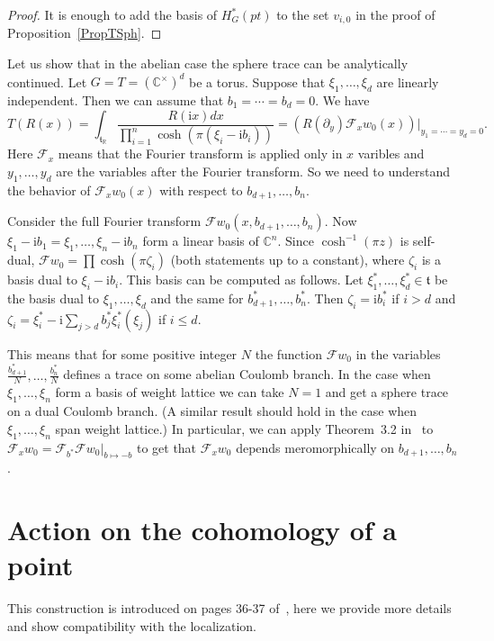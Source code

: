 \documentclass{article}
\newcommand{\R}{\mathbb{R}}
\renewcommand{\C}{\mathbb{C}}
\newcommand{\mf}{\mathfrak}
\newcommand{\mc}[1]{\mathcal{#1}}
\newcommand{\rmi}{\mathrm{i}}
\begin{document}
\begin{proof}
It is enough to add the basis of $H^*_G(pt)$ to the set $v_{i,0}$ in the proof of Proposition~\ref{PropTSph}.
\end{proof}
\begin{rem}
Let us show that in the abelian case the sphere trace can be analytically continued. Let $G=T=(\C^{\times})^d$ be a torus. Suppose that $\xi_1,\ldots,\xi_d$ are linearly independent. Then we can assume that $b_1=\cdots=b_d=0$. We have
\[T(R(x))=\int_{\mf{t}_{\R}}\frac{R(\rmi x)dx}{\prod_{i=1}^n \cosh(\pi(\xi_i-\rmi b_i))}=(R(\partial_y)\mc{F}_xw_0(x))|_{y_1=\cdots=y_d=0}.\] Here $\mc{F}_x$ means that the Fourier transform is applied only in $x$ varibles and $y_1,\ldots,y_d$ are the variables after the Fourier transform. So we need to understand the behavior of $\mc{F}_xw_0(x)$ with respect to $b_{d+1},\ldots,b_n$. 

Consider the full Fourier transform $\mc{F}w_0(x,b_{d+1},\ldots,b_n)$. Now $\xi_1-\rmi b_1=\xi_1,\ldots,\xi_n-\rmi b_n$ form a linear basis of $\C^n$. Since $\cosh^{-1}(\pi z)$ is self-dual, $\mc{F}w_0=\prod \cosh(\pi\zeta_i)$ (both statements up to a constant), where $\zeta_i$ is a basis dual to $\xi_i-\rmi b_i$. This basis can be computed as follows. Let $\xi_1^*,\ldots,\xi_d^*\in\mf{t}$ be the basis dual to $\xi_1,\ldots,\xi_d$ and the same for $b_{d+1}^*,\ldots,b_n^*$. Then $\zeta_i=\rmi b_i^*$ if $i>d$ and $\zeta_i=\xi_i^*-\rmi\sum_{j>d}b_j^*\xi_i^*(\xi_j)$ if $i\leq d$.

This means that for some positive integer $N$ the function $\mc{F}w_0$ in the variables $\frac{b_{d+1}^*}{N},\ldots,\frac{b_n^*}N$ defines a trace on some abelian Coulomb branch. In the case when $\xi_1,\ldots,\xi_n$ form a basis of weight lattice we can take $N=1$ and get a sphere trace on a dual Coulomb branch. (A similar result should hold in the case when $\xi_1,\ldots,\xi_n$ span weight lattice.) In particular, we can apply Theorem~3.2 in~\cite{KAb} to $\mc{F}_xw_0=\mc{F}_{b^*}\mc{F}w_0|_{b\mapsto -b}$ to get that $\mc{F}_xw_0$ depends meromorphically on $b_{d+1},\ldots,b_n$.
\end{rem}
\appendix
\section{Action on the cohomology of a point}
\label{SecCohomology}
This construction is introduced on pages 36-37 of~\cite{LW}, here we provide more details and show compatibility with the localization.
\end{document}
